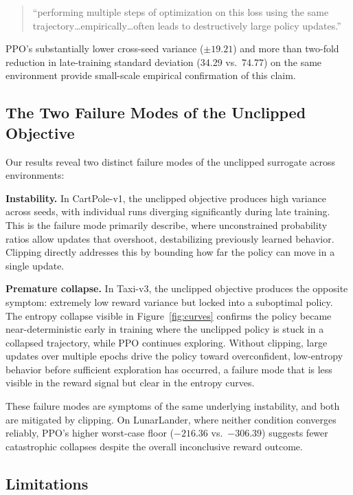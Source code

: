 \documentclass{article}
\begin{document}
\begin{quote}
``performing multiple steps of optimization on this loss using the same trajectory\ldots empirically\ldots often leads to destructively large policy updates.''
\end{quote}

PPO's substantially lower cross-seed variance ($\pm 19.21$) and more than two-fold reduction in late-training standard deviation (34.29 vs.\ 74.77) on the same environment provide small-scale empirical confirmation of this claim.

\subsection{The Two Failure Modes of the Unclipped Objective}

Our results reveal two distinct failure modes of the unclipped surrogate across environments:

\textbf{Instability.} In CartPole-v1, the unclipped objective produces high variance across seeds, with individual runs diverging significantly during late training. This is the failure mode \citet{schulman2017ppo} primarily describe, where unconstrained probability ratios allow updates that overshoot, destabilizing previously learned behavior. Clipping directly addresses this by bounding how far the policy can move in a single update.

\textbf{Premature collapse.} In Taxi-v3, the unclipped objective produces the opposite symptom: extremely low reward variance but locked into a suboptimal policy. The entropy collapse visible in Figure~\ref{fig:curves} confirms the policy became near-deterministic early in training where the unclipped policy is stuck in a collapsed trajectory, while PPO continues exploring. Without clipping, large updates over multiple epochs drive the policy toward overconfident, low-entropy behavior before sufficient exploration has occurred, a failure mode that is less visible in the reward signal but clear in the entropy curves.

These failure modes are symptoms of the same underlying instability, and both are mitigated by clipping. On LunarLander, where neither condition converges reliably, PPO's higher worst-case floor ($-216.36$ vs.\ $-306.39$) suggests fewer catastrophic collapses despite the overall inconclusive reward outcome.

\subsection{Limitations}
\end{document}
